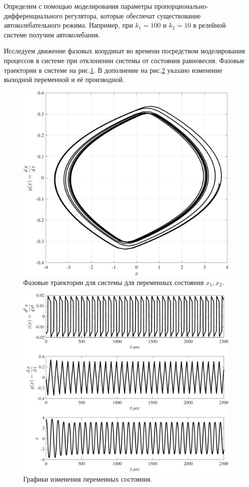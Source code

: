 Определим с помощью моделирования параметры пропорционально- дифференциального регулятора, которые обеспечат существование автоколебательного режима. Например, при $k_1=100$ и $k_2=10$  в релейной системе получим автоколебания.

Исследуем движение фазовых координат во времени посредством моделирования процессов в системе при отклонении системы от состояния равновесия. Фазовые траектории в системе на рис.\ref{fig:relay_system_ft_relay_2}. 
В дополнение на рис.\ref{fig:relay_system_sv_relay} указано изменение выходной переменной и её производной. 
\begin{figure}[!h]\centering
\includegraphics[width=0.7\linewidth]{images/relay_system_ft_relay_2}
\caption{ Фазовые траектории для системы  для переменных состояния $x_1,x_2$.}\label{fig:relay_system_ft_relay_2}
\end{figure}
\begin{figure}[!h]\centering
\includegraphics[width=1.0\linewidth]{images/relay_system_sv_relay}
\caption{ Графики изменения переменных состояния.}\label{fig:relay_system_sv_relay}
\end{figure}


